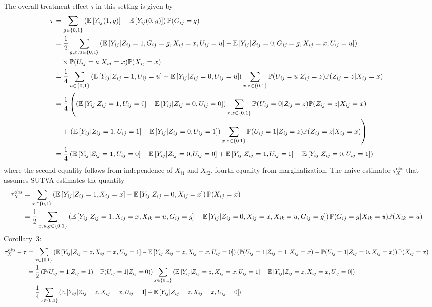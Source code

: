 \documentclass[10pt]{article}
\begin{document}
\todo The overall treatment effect $\tau$ in this setting is given by
\begin{align*}
\tau &= \sum_{g\in\{0,1\}} \left(\mathbb{E}\left[Y_{ij}(1,g)\right] - \mathbb{E}\left[Y_{ij}(0,g)\right]\right)\mathbb{P}(G_{ij}=g) \\
&= \frac{1}{2}\sum_{g,x,u\in\{0,1\}} \left(\mathbb{E}\left[Y_{ij}|Z_{ij}=1,G_{ij}=g,X_{ij}=x,U_{ij}=u\right] - \mathbb{E}\left[Y_{ij}|Z_{ij}=0,G_{ij}=g,X_{ij}=x,U_{ij}=u\right]\right) \\
&\quad \times \mathbb{P}(U_{ij}=u|X_{ij}=x)\mathbb{P}(X_{ij}=x) \\
&= \frac{1}{4}\sum_{u\in\{0,1\}} \left(\mathbb{E}\left[Y_{ij}|Z_{ij}=1,U_{ij}=u\right] - \mathbb{E}\left[Y_{ij}|Z_{ij}=0,U_{ij}=u\right]\right)\sum_{x,z\in\{0,1\}}\mathbb{P}(U_{ij}=u|Z_{ij}=z)\mathbb{P}(Z_{ij}=z|X_{ij}=x) \\
&= \frac{1}{4}\left(\left(\mathbb{E}\left[Y_{ij}|Z_{ij}=1,U_{ij}=0\right] - \mathbb{E}\left[Y_{ij}|Z_{ij}=0,U_{ij}=0\right]\right)\sum_{x,z\in\{0,1\}}\mathbb{P}(U_{ij}=0|Z_{ij}=z)\mathbb{P}(Z_{ij}=z|X_{ij}=x) \right. \\
& \quad+ \left.\left(\mathbb{E}\left[Y_{ij}|Z_{ij}=1,U_{ij}=1\right] - \mathbb{E}\left[Y_{ij}|Z_{ij}=0,U_{ij}=1\right]\right)\sum_{x,z\in\{0,1\}}\mathbb{P}(U_{ij}=1|Z_{ij}=z)\mathbb{P}(Z_{ij}=z|X_{ij}=x)\right) \\
&= \frac{1}{4}\left(\mathbb{E}\left[Y_{ij}|Z_{ij}=1,U_{ij}=0\right] - \mathbb{E}\left[Y_{ij}|Z_{ij}=0,U_{ij}=0\right] + \mathbb{E}\left[Y_{ij}|Z_{ij}=1,U_{ij}=1\right] - \mathbb{E}\left[Y_{ij}|Z_{ij}=0,U_{ij}=1\right]\right)
\end{align*}
\todo where the second equality follows from independence of $X_{i1}$ and $X_{i2}$, fourth equality from marginalization. The naive estimator $\tau_{X}^\text{obs}$ that assumes SUTVA estimates the quantity
\begin{align*}
\tau_{X}^\text{obs} &= \sum_{x\in\{0,1\}}\left(\mathbb{E}\left[Y_{ij}|Z_{ij}=1,X_{ij}=x\right] - \mathbb{E}\left[Y_{ij}|Z_{ij}=0,X_{ij}=x\right]\right)\mathbb{P}(X_{ij}=x) \\
&= \frac{1}{2}\sum_{x,u,g\in\{0,1\}}\left(\mathbb{E}\left[Y_{ij}|Z_{ij}=1,X_{ij}=x,X_{ik}=u,G_{ij}=g\right] - \mathbb{E}\left[Y_{ij}|Z_{ij}=0,X_{ij}=x,X_{ik}=u,G_{ij}=g\right]\right)\mathbb{P}(G_{ij}=g|X_{ik}=u)\mathbb{P}(X_{ik}=u)
\end{align*}
Corollary~3:
\begin{align*}
\tau_{X}^\text{obs} - \tau &= \sum_{x\in\{0,1\}}\left(\mathbb{E}\left[Y_{ij}|Z_{ij}=z,X_{ij}=x,U_{ij}=1\right]-\mathbb{E}\left[Y_{ij}|Z_{ij}=z,X_{ij}=x,U_{ij}=0\right]\right)\left(\mathbb{P}(U_{ij}=1|Z_{ij}=1,X_{ij}=x)-\mathbb{P}(U_{ij}=1|Z_{ij}=0,X_{ij}=x)\right)\mathbb{P}(X_{ij}=x) \\
&= \frac{1}{2}\left(\mathbb{P}(U_{ij}=1|Z_{ij}=1)-\mathbb{P}(U_{ij}=1|Z_{ij}=0)\right)\sum_{x\in\{0,1\}}\left(\mathbb{E}\left[Y_{ij}|Z_{ij}=z,X_{ij}=x,U_{ij}=1\right]-\mathbb{E}\left[Y_{ij}|Z_{ij}=z,X_{ij}=x,U_{ij}=0\right]\right) \\
&= \frac{1}{4}\sum_{x\in\{0,1\}}\left(\mathbb{E}\left[Y_{ij}|Z_{ij}=z,X_{ij}=x,U_{ij}=1\right]-\mathbb{E}\left[Y_{ij}|Z_{ij}=z,X_{ij}=x,U_{ij}=0\right]\right)
\end{align*}
\end{document}
